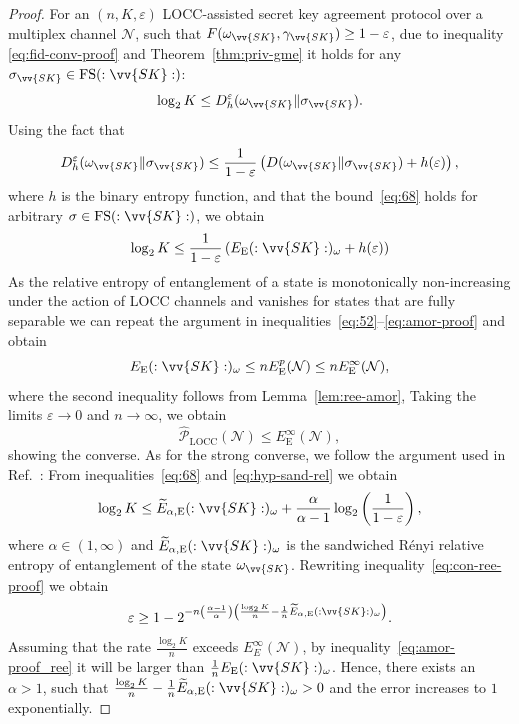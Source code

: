 \documentclass[aps,pra,twocolumn,superscriptaddress,longbibliography]{revtex4-1}
\def\FS{\operatorname{FS}}
\def\E{\operatorname{E}}
\def\LOCC{\operatorname{LOCC}}
\def\({\left(}
\def\){\right)}
\newcommand{\mc}[1]{\mathcal{#1}}
\begin{document}
\begin{proof}
For an $(n,K,\varepsilon)$ LOCC-assisted secret key agreement protocol over a multiplex channel $\mc{N}$, such that $F(\omega_{\vv{SK}},\gamma_{\vv{SK}})\geq 1-\varepsilon$, due to inequality \eqref{eq:fid-conv-proof} and Theorem~\ref{thm:priv-gme} it holds for any $\sigma_{\vv{SK}}\in\FS(:\vv{SK}:)$:
\begin{equation}\label{eq:68}
\log_2 K\leq D^\varepsilon_h(\omega_{\vv{SK}}\Vert\sigma_{\vv{SK}}). 
\end{equation}
Using the fact that~\cite{WR12}
\begin{equation}
D^\varepsilon_h(\omega_{\vv{SK}}\Vert\sigma_{\vv{SK}}) \leq \frac{1}{1-\varepsilon}\(D(\omega_{\vv{SK}}\Vert\sigma_{\vv{SK}})+h(\varepsilon)\),
\end{equation}
where $h$ is the binary entropy function, and that the bound~\eqref{eq:68} holds for arbitrary $\sigma\in\FS(:\vv{SK}:)$, we obtain
\begin{equation}\label{eq:con-ree-proof-1}
\log_2 K \leq \frac{1}{1-\varepsilon}\(E_{\E}(:\vv{SK}:)_{\omega}+h(\varepsilon)\)\end{equation}
As the relative entropy of entanglement of a state is monotonically non-increasing under the action of LOCC channels and vanishes for states that are fully separable we can repeat the argument in inequalities~\eqref{eq:52}--\eqref{eq:amor-proof} and obtain
\begin{equation}\label{eq:amor-proof_ree}
E_{\E}(:\vv{SK}:)_{\omega}\leq n E^p_{\E}(\mc{N})\leq n E^\infty_{\E}(\mc{N}),
\end{equation}
where the second inequality follows from Lemma~\ref{lem:ree-amor}, Taking the limits $\varepsilon\to0$ and $n\to\infty$, we obtain \begin{equation}
\hat{\mc{P}}_{\LOCC}(\mc{N})\leq E^\infty_{\E}(\mc{N}),
\end{equation}
showing the converse. As for the strong converse, we follow the argument used in Ref.~\cite{WTB16}: From inequalities~\eqref{eq:68} and  \eqref{eq:hyp-sand-rel} we obtain
\begin{equation}\label{eq:con-ree-proof}
\log_2 K \leq \widetilde{E}_{\alpha,\E}(:\vv{SK}:)_{\omega}+\frac{\alpha}{\alpha-1}\log_2\left(\frac{1}{1-\varepsilon}\right),
\end{equation}
where $\alpha\in(1,\infty)$ and $\widetilde{E}_{\alpha,\E}(:\vv{SK}:)_{\omega}$ is the sandwiched R\'{e}nyi relative entropy of entanglement of the state $\omega_{\vv{SK}}$. Rewriting inequality~\eqref{eq:con-ree-proof} we obtain
\begin{equation}
\varepsilon\geq 1- 2^{-n\(\frac{\alpha-1}{\alpha}\)\(\frac{\log_2 K}{n}-\frac{1}{n}\widetilde{E}_{\alpha,\E}(:\vv{SK}:)_{\omega}\)}.
\end{equation}
Assuming that the rate $\frac{\log_2 K}{n}$ exceeds $E_{E}^\infty(\mc{N})$, by inequality~\eqref{eq:amor-proof_ree} it will be larger than $\frac{1}{n}E_{\E}(:\vv{SK}:)_{\omega}$. Hence, there exists an $\alpha>1$, such that $\frac{\log_2 K}{n}-\frac{1}{n}\widetilde{E}_{\alpha,\E}(:\vv{SK}:)_{\omega}>0$ and the error increases to $1$ exponentially.
\end{proof}
\fi
\end{document}
